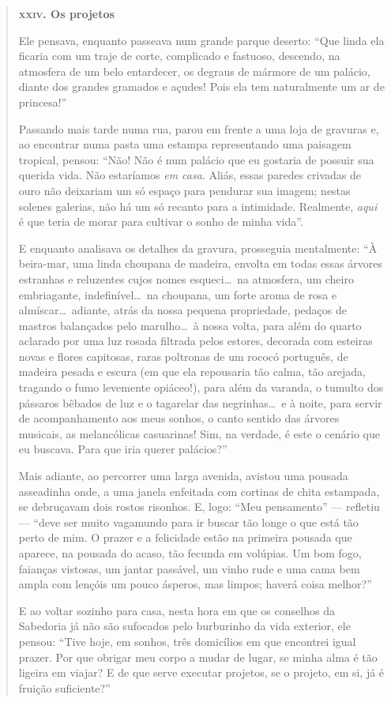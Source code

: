 \documentclass[12pt]{extarticle}
\begin{document}
\begin{quote}
\dotfill

\textbf{\textsc{xxiv.} Os projetos}\medskip

Ele pensava, enquanto passeava num grande parque deserto:
``Que linda ela ficaria com um traje de corte, complicado
e fastuoso, descendo, na atmosfera de um belo entardecer, os
degraus de mármore de um palácio, diante dos grandes gramados e açudes!
Pois ela tem naturalmente um ar de princesa!''

Passando mais tarde numa rua, parou em frente a uma loja de gravuras
e, ao encontrar numa pasta uma estampa representando uma paisagem
tropical, pensou: ``Não! Não é num palácio que eu gostaria
de possuir sua querida vida. Não estaríamos \textit{em casa}. Aliás, essas
paredes crivadas de ouro não deixariam um só espaço para pendurar sua
imagem; nestas solenes galerias, não há um só recanto para a
intimidade. Realmente, \textit{aqui} é que teria de morar para cultivar
o sonho de minha vida''.

E enquanto analisava os detalhes da gravura, prosseguia mentalmente:
``À beira-mar, uma linda choupana de madeira, envolta
em todas essas árvores estranhas e reluzentes cujos nomes esqueci\ldots\ 
na atmosfera, um cheiro embriagante, indefinível\ldots\  na choupana, um
forte aroma de rosa e almíscar\ldots\  adiante, atrás da nossa
pequena propriedade, pedaços de mastros balançados pelo marulho\ldots\  à nossa volta, para além do quarto aclarado por uma luz rosada filtrada
pelos estores, decorada com esteiras novas e flores capitosas, raras poltronas de um rococó português, de madeira pesada e escura (em
que ela repousaria tão calma, tão arejada, tragando o fumo
levemente opiáceo!), para além da varanda, o tumulto dos pássaros bêbados de
luz e o tagarelar das negrinhas\ldots\  e à noite, para servir de
acompanhamento aos meus sonhos, o canto sentido das árvores musicais,
as melancólicas casuarinas! Sim, na verdade, é este o cenário que eu
buscava. Para que iria querer palácios?''

Mais adiante, ao percorrer uma larga avenida, avistou uma pousada
asseadinha onde, a uma janela enfeitada com cortinas de chita
estampada, se debruçavam dois rostos risonhos. E, logo:
``Meu pensamento'' --- refletiu --- ``deve ser muito vagamundo
para ir buscar tão longe o que está tão perto de mim. O prazer e a
felicidade estão na primeira pousada que aparece, na pousada do
acaso, tão fecunda em volúpias. Um bom fogo, faianças vistosas, um
jantar passável, um vinho rude e uma cama bem ampla com lençóis um
pouco ásperos, mas limpos; haverá coisa melhor?''

E ao voltar sozinho para casa, nesta hora em que os conselhos da
Sabedoria já não são sufocados pelo burburinho da vida exterior,
ele pensou: ``Tive hoje, em sonhos, três domicílios em que
encontrei igual prazer. Por que obrigar meu corpo a mudar de lugar, 
se minha alma é tão ligeira em viajar? E de que serve executar projetos,
se o projeto, em si, já é fruição suficiente?''

\dotfill
\end{quote}
\end{document}
